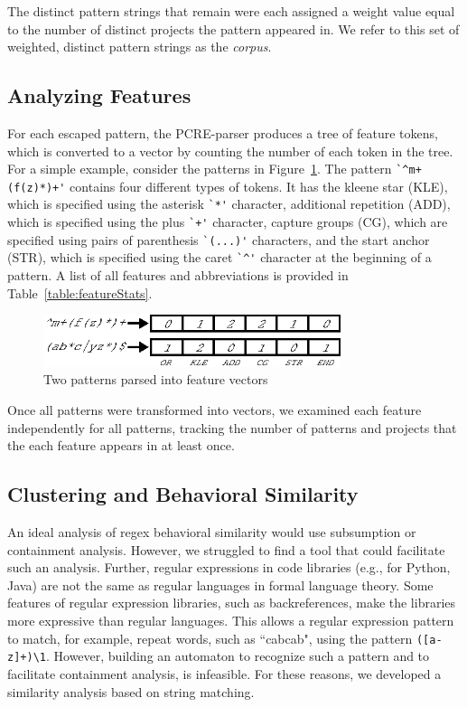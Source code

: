 The  distinct pattern strings that remain were each assigned a weight value equal to the number of distinct projects the pattern appeared in.  We  refer to this set of weighted, distinct pattern strings as the \emph{corpus}.

\subsection{Analyzing Features}
\label{study:features}
For each escaped pattern, the PCRE-parser produces a tree of feature tokens, which is converted to a vector by counting the number of each token  in the tree.  For a simple example, consider the patterns in Figure~\ref{fig:featureParsing}.  The pattern \verb!`^m+(f(z)*)+'! contains four different types of tokens. It has the kleene star (KLE), which is specified using the asterisk \verb!`*'! character, additional repetition (ADD), which is specified using the plus \verb!`+'! character, capture groups (CG), which are specified using pairs of parenthesis \verb!`(...)'! characters, and the start anchor (STR), which is specified using the caret \verb!`^'! character at the beginning of a pattern. A list of all features and abbreviations is provided in Table~\ref{table:featureStats}.

\begin{figure}[tb]
\centering
\includegraphics[height=0.6in]{nontex/featureParsing.eps}
\caption{Two patterns parsed into feature vectors}
\label{fig:featureParsing}
\vspace{-12pt}
\end{figure}

Once all patterns were transformed into vectors, we examined each feature independently for all patterns, tracking the number of patterns and  projects that the each feature appears in at least once.

\subsection{Clustering and Behavioral Similarity}
An ideal analysis of regex behavioral similarity would use subsumption or containment analysis. However, we struggled to find a tool that could facilitate such an analysis. Further, regular expressions in code libraries (e.g., for Python, Java) are not the same as regular languages in formal language theory. Some features of regular expression libraries, such as backreferences, make the libraries more expressive than regular languages. This allows a regular expression pattern to match, for example, repeat words, such as ``cabcab", using the pattern {\tt ([a-z]+)\verb!\!1}. However, building an automaton to recognize such a pattern and to facilitate containment analysis, is infeasible.
For these reasons, we developed a similarity analysis based on string matching.

